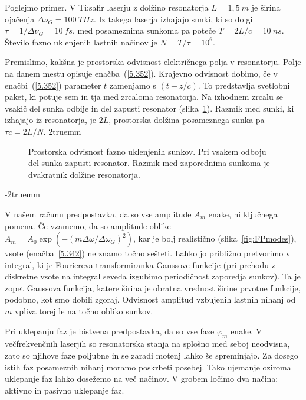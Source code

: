 Poglejmo primer. V Ti:safir laserju z dolžino resonatorja $L=1,5~\si{m}$ je 
širina ojačenja $\Delta \nu_G = 100~\si{THz}$. Iz takega laserja izhajajo
sunki, ki so dolgi $\tau = 1/\Delta \nu_G = 10~\si{fs}$, med posameznima sunkoma pa
poteče $T = 2L/c = 10~\si{ns}$. Število fazno uklenjenih lastnih načinov je 
$N = T/\tau = 10^6$.

Premislimo, kakšna je prostorska odvisnost električnega polja v
resonatorju. Polje na danem mestu opisuje enačba~(\ref{5.352}). Krajevno 
odvisnost dobimo, če v enačbi~(\ref{5.352}) parameter $t$ zamenjamo s $(t-z/c)$. To
predstavlja svetlobni paket, ki potuje sem in tja med zrcaloma
resonatorja. Na izhodnem zrcalu se vsakič del sunka odbije in del zapusti
resonator (slika~\ref{fig.5.11}). Razmik med sunki, ki izhajajo iz
resonatorja, je $2L$, prostorska dolžina posameznega sunka pa $\tau c=2L/N$.
\vglue2truemm

\begin{figure}[ht]
\centering
\def\svgwidth{120truemm} 

\caption{Prostorska odvisnost fazno uklenjenih sunkov. Pri vsakem odboju del
sunka zapusti resonator. Razmik med zaporednima sunkoma je dvakratnik dolžine resonatorja.}
\label{fig.5.11}
\end{figure}
\vglue-2truemm
\begin{remark}
V našem računu predpostavka, da so vse amplitude $A_{m}$ enake, ni ključnega 
pomena. Če vzamemo, da so amplitude oblike 
$A_{m}=A_{0}\exp (-(m\Delta \omega /\Delta \omega_{G})^{2})$, 
kar je bolj realistično (slika~\ref{fig:FPmodes}), vsote (enačba~\ref{5.342}) 
ne znamo točno sešteti. Lahko jo
približno pretvorimo v integral, ki je Fouriereva transformiranka Gaussove
funkcije (pri prehodu z diskretne vsote na integral seveda izgubimo
periodičnost zaporedja sunkov). Ta je zopet Gaussova funkcija, katere
širina je obratna vrednost širine prvotne funkcije, podobno, kot
smo dobili zgoraj. Odvisnost amplitud vzbujenih lastnih nihanj od $m$ 
vpliva torej le na točno obliko sunkov.
\end{remark}
Pri uklepanju faz je bistvena predpostavka, da so vse faze $\varphi_m$ enake. 
V večfrekvenčnih laserjih so resonatorska stanja na splošno med seboj
neodvisna, zato so njihove faze poljubne in se zaradi motenj lahko še spreminjajo.
Za dosego istih faz posameznih nihanj moramo poskrbeti posebej. Tako ujemanje
oziroma uklepanje faz lahko dosežemo na več načinov. V grobem ločimo dva načina:
aktivno in pasivno uklepanje faz.

